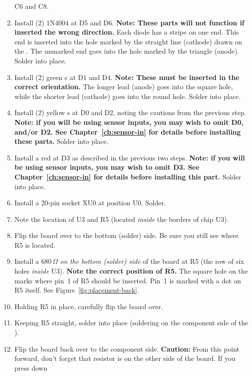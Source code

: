 \documentclass[letterpaper,twoside,onecolumn,openright,final]{memoir}
\begin{document}
\begin{enumerate}
	C6 and C8.
\item	Install (2) 1N4004  at D5 and D6.  
	{\bfseries Note: These parts will not function
	if inserted the wrong direction.} Each diode has
	a stripe on one end. This end is inserted into the hole marked by the straight line (cathode)
	drawn on the .  The unmarked end goes into the hole marked by the triangle
	(anode).  Solder into place. 
\item	Install (2) green s at D1 and D4.  
	{\bfseries Note: These must be inserted in the 
	correct orientation.} The longer lead (anode) goes into the 
	square hole, while the shorter
	lead (cathode) goes into the round hole.  Solder into place.
\item	Install (2) yellow s at D0 and D2, noting the 
	cautions from the previous step.
	{\bfseries Note: if you will be using sensor inputs, you may
	wish to omit D0, and/or D2.  See Chapter~\ref{ch:sensor-in} for 
	details before installing these parts.}
	Solder into place.
\item	Install a red  at D3 as described in the previous
	two steps.  
	{\bfseries Note: if you will be using sensor inputs, you may
	wish to omit D3.  See Chapter~\ref{ch:sensor-in} for 
	details before installing this part.}
	Solder into place.
\item	Install a 20-pin  socket XU0 at position U0. Solder.
\item	Note the location of U3 and R5 (located \emph{inside} the borders 
	of chip U3).
\item	Flip the board over to the bottom (solder) side.  Be sure you still see where R5 is
	located.
\item
	Install a 680\,$\Omega$  
	\emph{on the bottom (solder) side} of the board at
	R5 (the row of six holes \emph{inside} U3).  {\bfseries Note the correct position of R5.} The
	square hole on the  marks where pin~1 of R5 should be inserted.  Pin~1 is marked
	with a dot on R5 itself. See Figure~\ref{fig:placement-back}.
\item	Holding R5 in place, carefully flip the board over.
\item
	Keeping R5 straight, solder into place (soldering on the component side of the ).
\item	Flip the board back over to the component side.  {\bfseries Caution:} From this point 
	forward, don't forget that resistor is on the other side of the board.  If you press down

\end{enumerate}
\end{document}
